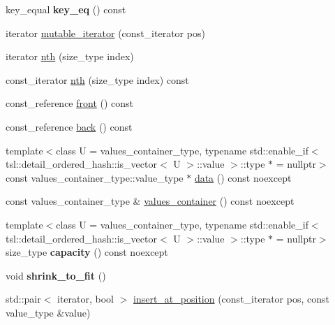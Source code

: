 \begin{DoxyCompactItemize}
key\+\_\+equal {\bfseries key\+\_\+eq} () const
\item 
iterator \mbox{\hyperlink{classtsl_1_1ordered__map_a6c8a42673fdc00829cde071eb1c5792d}{mutable\+\_\+iterator}} (const\+\_\+iterator pos)
\item 
iterator \mbox{\hyperlink{classtsl_1_1ordered__map_a93bb4548ff4b0fd8dddfc5d7e3da6095}{nth}} (size\+\_\+type index)
\item 
const\+\_\+iterator \mbox{\hyperlink{classtsl_1_1ordered__map_a093e3023c3c0b025bf2c94d418d6d9b4}{nth}} (size\+\_\+type index) const
\item 
const\+\_\+reference \mbox{\hyperlink{classtsl_1_1ordered__map_afc365c7b0c083992f03f05a168f9d1e4}{front}} () const
\item 
const\+\_\+reference \mbox{\hyperlink{classtsl_1_1ordered__map_a872ba5948f124a365dac691057c344d4}{back}} () const
\item 
{\footnotesize template$<$class U  = values\+\_\+container\+\_\+type, typename std\+::enable\+\_\+if$<$ tsl\+::detail\+\_\+ordered\+\_\+hash\+::is\+\_\+vector$<$ U $>$\+::value $>$\+::type $\ast$  = nullptr$>$ }\\const values\+\_\+container\+\_\+type\+::value\+\_\+type $\ast$ \mbox{\hyperlink{classtsl_1_1ordered__map_aad8598e2f2dfeed429cfe80a1884ba20}{data}} () const noexcept
\item 
const values\+\_\+container\+\_\+type \& \mbox{\hyperlink{classtsl_1_1ordered__map_abb69bca0a80def48ae806078d77175cb}{values\+\_\+container}} () const noexcept
\item 
\mbox{\label{classtsl_1_1ordered__map_a57e1ef580fa53df3ebf1c5926662981e}} 
{\footnotesize template$<$class U  = values\+\_\+container\+\_\+type, typename std\+::enable\+\_\+if$<$ tsl\+::detail\+\_\+ordered\+\_\+hash\+::is\+\_\+vector$<$ U $>$\+::value $>$\+::type $\ast$  = nullptr$>$ }\\size\+\_\+type {\bfseries capacity} () const noexcept
\item 
\mbox{\label{classtsl_1_1ordered__map_a61d75f9d672a31209e45ee2d8e449b36}} 
void {\bfseries shrink\+\_\+to\+\_\+fit} ()
\item 
std\+::pair$<$ iterator, bool $>$ \mbox{\hyperlink{classtsl_1_1ordered__map_a1d8e2e86cb1443f623f8476eb2300129}{insert\+\_\+at\+\_\+position}} (const\+\_\+iterator pos, const value\+\_\+type \&value)
\item 

\end{DoxyCompactItemize}
